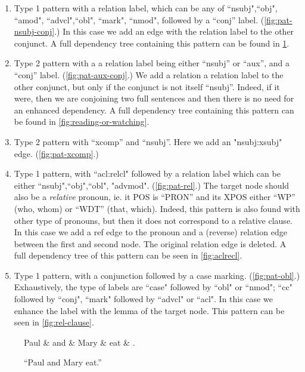 \documentclass[11pt,a4paper]{article}
\begin{document}
\begin{enumerate}
\item Type 1 pattern with a relation label, which can be any of
  ``nsubj",``obj", ``amod", ``advcl",``obl", ``mark", ``nmod", followed by a
  ``conj'' label. (\cref{fig:pat-nsubj-conj}.) In this case we add an
  edge with the relation label to the other conjunct.
  A full dependency tree containing this pattern can be found in \cref{fig:paul-and-mary}.
  \label{item:paul-and-mary}
\item Type 2 pattern with a a relation label being either ``nsubj'' or
  ``aux'', and a ``conj'' label. (\cref{fig:pat-aux-conj}.) We add a relation a relation label to
  the other conjunct, but only if the conjunct is not itself
  ``nsubj''. Indeed, if it were, then we are conjoining two full
  sentences and then there is no need for an enhanced dependency.
  A full dependency tree containing this pattern can be found in \cref{fig:reading-or-watching}.
  \label{item:reading-or-watching}
\item Type 2 pattern with ``xcomp'' and ``nsubj''. Here we add an
  "nsubj:xsubj" edge. (\cref{fig:pat-xcomp}.)
\item Type 1 pattern, with ``acl:relcl" followed by a relation label
  which can be either ``nsubj",``obj",``obl",
  "advmod". (\cref{fig:pat-rel}.) The target node should also be a
  \emph{relative} pronoun, ie. it POS is ``PRON'' and its XPOS either
  ``WP'' (who, whom) or ``WDT'' (that, which). Indeed, this pattern is
  also found with other type of pronouns, but then it does not
  correspond to a relative clause.  In this case we add a ref edge to
  the pronoun and a (reverse) relation edge between the first and
  second node. The original relation edge is deleted. A full dependency
  tree of this pattern can be seen in \cref{fig:aclrecl}.
  \item Type 1 pattern, with a conjunction followed by a case
   marking. (\cref{fig:pat-obl}.) Exhaustively, the type of labels
   are ``case" followed by ``obl" or ``nmod"; ``cc" followed by
   ``conj", ``mark" followed by ``advcl" or ``acl". In this case we
   enhance the label with the lemma of the target node. This pattern
   can be seen in \cref{fig:rel-clause}.
\end{enumerate}

\begin{figure}[h]
    \centering
    \begin{dependency}
    \begin{deptext}[column sep=1em]
    Paul \& and \& Mary \& eat \& . \\
    \end{deptext}
    \end{dependency}
    \caption{``Paul and Mary eat.''}
    \label{fig:paul-and-mary}
\end{figure}
\end{document}
